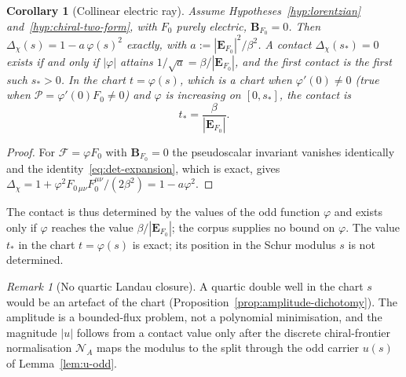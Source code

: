 \documentclass[11pt]{article}
\newtheorem{corollary}{Corollary}
\theoremstyle{definition}
\theoremstyle{remark}
\newtheorem{remark}{Remark}
\newcommand{\Fchi}{\mathcal{F}}
\newcommand{\Pchi}{\mathcal{P}}
\newcommand{\Dchi}{\Delta_{\chi}}
\begin{document}
    \begin{corollary}[Collinear electric ray]
      \label{cor:radial-contact}
      Assume Hypotheses~\ref{hyp:lorentzian} and~\ref{hyp:chiral-two-form}, with $F_0$ purely electric,
      $\mathbf B_{F_0}=0$.
      Then $\Dchi(s)=1-a\,\varphi(s)^2$ exactly, with $a:=|\mathbf{E}_{F_0}|^2/\beta^2$.
      A contact $\Dchi(s_*)=0$ exists if and only if $|\varphi|$ attains $1/\sqrt a=\beta/|\mathbf{E}_{F_0}|$, and the
      first
      contact is the first such $s_*>0$.
      In the chart $t=\varphi(s)$, which is a chart when $\varphi'(0)\neq0$ (true when $\Pchi=\varphi'(0)F_0\neq0$) and
      $\varphi$ is increasing on $[0,s_*]$, the contact is
      \begin{equation}
        \label{eq:s-star-affine}
        t_* = \frac{\beta}{|\mathbf{E}_{F_0}|} .
      \end{equation}
    \end{corollary}

    \begin{proof}
      For $\Fchi=\varphi F_0$ with $\mathbf{B}_{F_0}=0$ the pseudoscalar invariant vanishes identically and the
      identity~\eqref{eq:det-expansion}, which is exact, gives
      $\Dchi=1+\varphi^2F_{0\,\mu\nu}F_0^{\mu\nu}/(2\beta^2)=1-a\varphi^2$.
    \end{proof}

    The contact is thus determined by the values of the odd function $\varphi$ and exists only if $\varphi$ reaches the
    value $\beta/|\mathbf{E}_{F_0}|$; the corpus supplies no bound on $\varphi$.
    The value $t_*$ in the chart $t=\varphi(s)$ is exact; its position in the Schur modulus $s$ is not determined.

    \begin{remark}[No quartic Landau closure]
      \label{rem:not-landau}
      A quartic double well in the chart $s$ would be an artefact of the chart
      (Proposition~\ref{prop:amplitude-dichotomy}).
      The amplitude is a bounded-flux problem, not a polynomial minimisation, and the magnitude $|u|$ follows from a
      contact value only after the discrete chiral-frontier normalisation $\mathcal{N}_A$ maps the modulus to the
      split through the odd carrier $u(s)$ of Lemma~\ref{lem:u-odd}.
    \end{remark}
\end{document}
